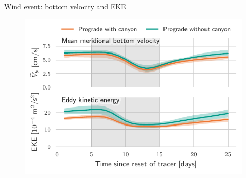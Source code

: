 \documentclass{beamer}
\begin{document}
\begin{frame}{Wind event: bottom velocity and EKE}
\begin{figure}
\centering
\includegraphics{figures/v_eke_Prograde_composite_Event.pdf}
\end{figure}
\end{frame}




\end{document}
